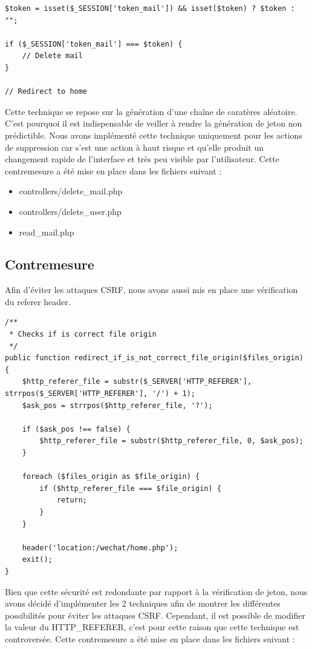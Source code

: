 \documentclass[12pt]{article}
\begin{document}
\begin{lstlisting}[style=JAVA]
$token = isset($_SESSION['token_mail']) && isset($token) ? $token : "";

if ($_SESSION['token_mail'] === $token) {
    // Delete mail
}

// Redirect to home
\end{lstlisting}

Cette technique se repose sur la génération d'une chaîne de caratères aléatoire. C'est pourquoi il est indispensable de veiller à rendre la génération de jeton non prédictible. Nous avons implémenté cette technique uniquement pour les actions de suppression car s'est une action à haut risque et qu'elle produit un changement rapide de l'interface et très peu visible par l'utilisateur. 
Cette contremesure a été mise en place dans les fichiers suivant :

\begin{itemize}
\item controllers/delete\_mail.php
\item controllers/delete\_user.php
\item read\_mail.php
\end{itemize}

\newpage
\subsection{Contremesure}\label{c4_2}

Afin d'éviter les attaques CSRF, nous avons aussi mis en place une vérification du referer header. 

\begin{lstlisting}[style=JAVA]
/**
 * Checks if is correct file origin
 */
public function redirect_if_is_not_correct_file_origin($files_origin) {
    $http_referer_file = substr($_SERVER['HTTP_REFERER'], strrpos($_SERVER['HTTP_REFERER'], '/') + 1);
    $ask_pos = strrpos($http_referer_file, '?');

    if ($ask_pos !== false) {
        $http_referer_file = substr($http_referer_file, 0, $ask_pos);
    }
    
    foreach ($files_origin as $file_origin) {
        if ($http_referer_file === $file_origin) {
            return;
        }
    }

    header('location:/wechat/home.php');
    exit();
}
\end{lstlisting}

Bien que cette sécurité est redondante par rapport à la vérification de jeton, nous avons décidé d'implémenter les 2 techniques afin de montrer les différentes possibilités pour éviter les attaques CSRF. Cependant, il est possible de modifier la valeur du HTTP\_REFERER, c'est pour cette raison que cette technique est controversée.
Cette contremesure a été mise en place dans les fichiers suivant :
\end{document}
